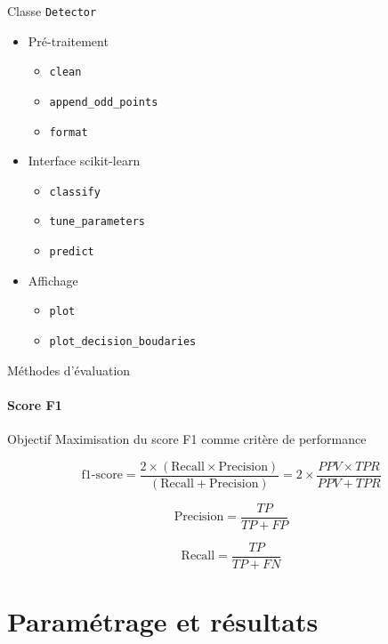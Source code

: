 \documentclass{beamer}
\begin{document}
\begin{frame}{Classe \texttt{Detector}}
\begin{itemize}
\item Pré-traitement \begin{itemize}
\item \texttt{clean}
\item \texttt{append\_odd\_points}
\item \texttt{format}
\end{itemize}
\item Interface scikit-learn \begin{itemize}
\item \texttt{classify}
\item \texttt{tune\_parameters}
\item \texttt{predict}
\end{itemize}
\item Affichage \begin{itemize}
\item \texttt{plot}
\item  \texttt{plot\_decision\_boudaries}
\end{itemize}
\end{itemize}
\end{frame}

\begin{frame}{Méthodes d'évaluation}
\framesubtitle{Score F1}

\begin{block}{Objectif}
Maximisation du score F1 comme critère de performance
\end{block}

\begin{equation}
\text{f1-score} = \dfrac{2\times(\text{Recall} \times \text{Precision})}{(\text{Recall} + \text{Precision})} = 2\times\dfrac{PPV \times TPR}{PPV + TPR}
\end{equation}

\begin{equation}
\text{Precision} = \dfrac{TP}{TP+FP}
\end{equation}

\begin{equation}
\text{Recall} = \dfrac{TP}{TP+FN}
\end{equation}

\end{frame}

\section{Paramétrage et résultats}
\end{document}
